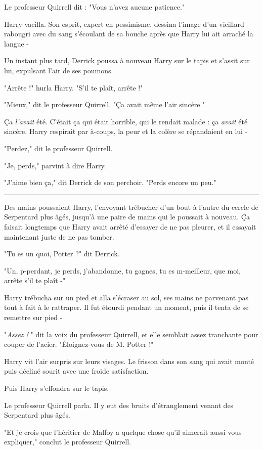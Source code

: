 Le professeur Quirrell dit : "Vous n'avez aucune patience."

Harry vacilla. Son esprit, expert en pessimisme, dessina l'image d'un vieillard rabougri avec du sang s'écoulant de sa bouche après que Harry lui ait arraché la langue -

Un instant plus tard, Derrick poussa à nouveau Harry sur le tapis et s'assit sur lui, expulsant l'air de ses poumons.

"Arrête !" hurla Harry. "S'il te plaît, arrête !"

"Mieux," dit le professeur Quirrell. "Ça avait même l'air sincère."

Ça \emph{l'avait}  été. C'était ça qui était horrible, qui le rendait malade : ça \emph{avait}  été sincère. Harry respirait par à-coups, la peur et la colère se répandaient en lui -

"Perdez," dit le professeur Quirrell.

"Je, perds," parvint à dire Harry.

"J'aime bien ça," dit Derrick de son perchoir. "Perds encore un peu."
\par\noindent\rule{\textwidth}{0.4pt}
Des mains poussaient Harry, l'envoyant trébucher d'un bout à l'autre du cercle de Serpentard plus âgés, jusqu'à une paire de mains qui le poussait à nouveau. Ça faisait longtemps que Harry avait arrêté d'essayer de ne pas pleurer, et il essayait maintenant juste de ne pas tomber.

"Tu es un quoi, Potter ?" dit Derrick.

"Un, p-perdant, je perds, j'abandonne, tu gagnes, tu es m-meilleur, que moi, arrête s'il te plaît -"

Harry trébucha sur un pied et alla s'écraser au sol, ses mains ne parvenant pas tout à fait à le rattraper. Il fut étourdi pendant un moment, puis il tenta de se remettre sur pied -

"\emph{Assez !} " dit la voix du professeur Quirrell, et elle semblait assez tranchante pour couper de l'acier. "Éloignez-vous de M. Potter !"

Harry vit l'air surpris sur leurs visages. Le frisson dans son sang qui avait monté puis décliné sourit avec une froide satisfaction.

Puis Harry s'effondra sur le tapis.

Le professeur Quirrell parla. Il y eut des bruits d'étranglement venant des Serpentard plus âgés.

"Et je crois que l'héritier de Malfoy a quelque chose qu'il aimerait aussi vous expliquer," conclut le professeur Quirrell.

